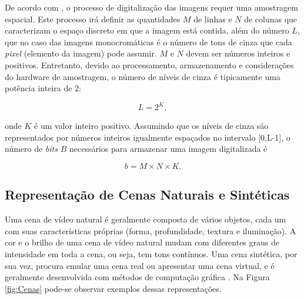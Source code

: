 	De acordo com \cite{gonzalez2004digital}, o processo de digitalização das imagens requer uma amostragem espacial. Este processo irá definir as quantidades $M$ de linhas e $N$ de colunas que caracterizam o espaço discreto em que a imagem está contida, além do número $L$, que no caso das imagens monocromáticas é o número de tons de cinza que cada \textit{pixel} (elemento da imagem) pode assumir. $M$ e $N$ devem ser números inteiros e positivos. Entretanto, devido ao processamento, armazenamento e considerações do hardware de amostragem, o número de níveis de cinza é tipicamente uma potência inteira de 2:
\vspace{-1cm}
\begin{center}
	\begin{equation}
		L = 2^K,
	\end{equation}
\end{center}	 
\noindent onde $K$ é um valor inteiro positivo. Assumindo que os níveis de cinza são representados por números inteiros igualmente espaçados no intervalo [0,L-1], o número de \textit{bits} $B$ necessários para armazenar uma imagem digitalizada é

\begin{equation}
	b = M \times N \times K.
\end{equation}

\subsection{Representação de Cenas Naturais e Sintéticas}

Uma cena de vídeo natural é geralmente composta de vários objetos, cada um com suas características próprias (forma, profundidade, textura e iluminação). A cor e o brilho de uma cena de vídeo natural mudam com diferentes graus de intensidade em toda a cena, ou seja, tem tons contínuos. Uma cena sintética, por sua vez, procura emular uma cena real ou apresentar uma cena virtual, e é geralmente desenvolvida com métodos de computação gráfica \cite{scharstein2002taxonomy}. Na Figura \ref{fig:Cenas} pode-se observar exemplos dessas representações.

